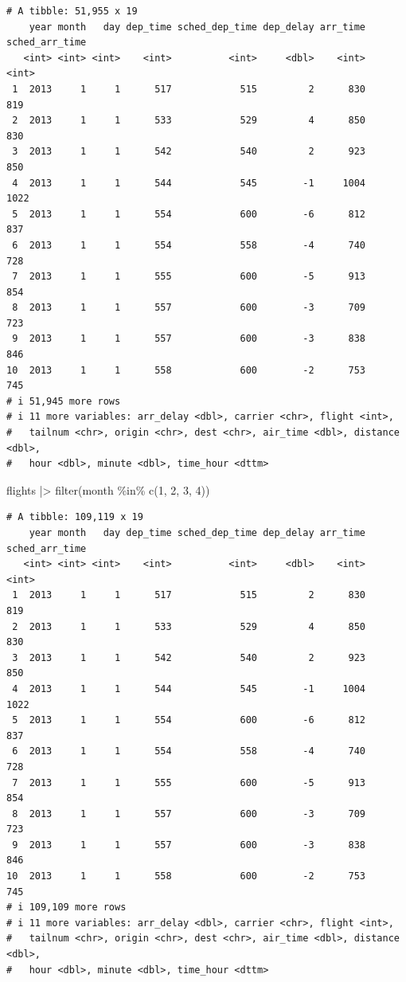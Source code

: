 \documentclass[
  letterpaper,
  DIV=11,
  numbers=noendperiod]{scrreprt}
\newenvironment{Shaded}{\begin{snugshade}}{\end{snugshade}}
\newcommand{\DecValTok}[1]{\textcolor[rgb]{0.68,0.00,0.00}{#1}}
\newcommand{\FunctionTok}[1]{\textcolor[rgb]{0.28,0.35,0.67}{#1}}
\newcommand{\NormalTok}[1]{\textcolor[rgb]{0.00,0.23,0.31}{#1}}
\newcommand{\SpecialCharTok}[1]{\textcolor[rgb]{0.37,0.37,0.37}{#1}}
\begin{document}
\begin{verbatim}
# A tibble: 51,955 x 19
    year month   day dep_time sched_dep_time dep_delay arr_time sched_arr_time
   <int> <int> <int>    <int>          <int>     <dbl>    <int>          <int>
 1  2013     1     1      517            515         2      830            819
 2  2013     1     1      533            529         4      850            830
 3  2013     1     1      542            540         2      923            850
 4  2013     1     1      544            545        -1     1004           1022
 5  2013     1     1      554            600        -6      812            837
 6  2013     1     1      554            558        -4      740            728
 7  2013     1     1      555            600        -5      913            854
 8  2013     1     1      557            600        -3      709            723
 9  2013     1     1      557            600        -3      838            846
10  2013     1     1      558            600        -2      753            745
# i 51,945 more rows
# i 11 more variables: arr_delay <dbl>, carrier <chr>, flight <int>,
#   tailnum <chr>, origin <chr>, dest <chr>, air_time <dbl>, distance <dbl>,
#   hour <dbl>, minute <dbl>, time_hour <dttm>
\end{verbatim}

\begin{Shaded}
\begin{Highlighting}[]
\NormalTok{flights }\SpecialCharTok{|\textgreater{}}
  \FunctionTok{filter}\NormalTok{(month }\SpecialCharTok{\%in\%} \FunctionTok{c}\NormalTok{(}\DecValTok{1}\NormalTok{, }\DecValTok{2}\NormalTok{, }\DecValTok{3}\NormalTok{, }\DecValTok{4}\NormalTok{))}
\end{Highlighting}
\end{Shaded}

\begin{verbatim}
# A tibble: 109,119 x 19
    year month   day dep_time sched_dep_time dep_delay arr_time sched_arr_time
   <int> <int> <int>    <int>          <int>     <dbl>    <int>          <int>
 1  2013     1     1      517            515         2      830            819
 2  2013     1     1      533            529         4      850            830
 3  2013     1     1      542            540         2      923            850
 4  2013     1     1      544            545        -1     1004           1022
 5  2013     1     1      554            600        -6      812            837
 6  2013     1     1      554            558        -4      740            728
 7  2013     1     1      555            600        -5      913            854
 8  2013     1     1      557            600        -3      709            723
 9  2013     1     1      557            600        -3      838            846
10  2013     1     1      558            600        -2      753            745
# i 109,109 more rows
# i 11 more variables: arr_delay <dbl>, carrier <chr>, flight <int>,
#   tailnum <chr>, origin <chr>, dest <chr>, air_time <dbl>, distance <dbl>,
#   hour <dbl>, minute <dbl>, time_hour <dttm>
\end{verbatim}
\end{document}
